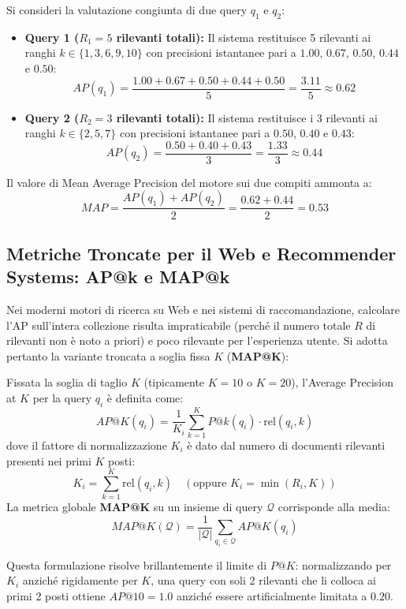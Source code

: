 \begin{example}
Si consideri la valutazione congiunta di due query $q_1$ e $q_2$:
\begin{itemize}
    \item \textbf{Query 1 ($R_1 = 5$ rilevanti totali):} Il sistema restituisce 5 rilevanti ai ranghi $k \in \{1, 3, 6, 9, 10\}$ con precisioni istantanee pari a $1.00$, $0.67$, $0.50$, $0.44$ e $0.50$:
    \[
    AP(q_1) = \frac{1.00 + 0.67 + 0.50 + 0.44 + 0.50}{5} = \frac{3.11}{5} \approx \mathbf{0.62}
    \]
    \item \textbf{Query 2 ($R_2 = 3$ rilevanti totali):} Il sistema restituisce i 3 rilevanti ai ranghi $k \in \{2, 5, 7\}$ con precisioni istantanee pari a $0.50$, $0.40$ e $0.43$:
    \[
    AP(q_2) = \frac{0.50 + 0.40 + 0.43}{3} = \frac{1.33}{3} \approx \mathbf{0.44}
    \]
\end{itemize}
Il valore di Mean Average Precision del motore sui due compiti ammonta a:
\begin{equation}
MAP = \frac{AP(q_1) + AP(q_2)}{2} = \frac{0.62 + 0.44}{2} = \mathbf{0.53}
\end{equation}
\end{example}

\subsection{Metriche Troncate per il Web e Recommender Systems: AP@k e MAP@k}
Nei moderni motori di ricerca su Web e nei sistemi di raccomandazione, calcolare l'AP sull'intera collezione risulta impraticabile (perché il numero totale $R$ di rilevanti non è noto a priori) e poco rilevante per l'esperienza utente.
Si adotta pertanto la variante troncata a soglia fissa $K$ (\textbf{MAP@K}):

\begin{definition}[AP@K e MAP@K]
Fissata la soglia di taglio $K$ (tipicamente $K=10$ o $K=20$), l'Average Precision at $K$ per la query $q_i$ è definita come:
\begin{equation}
AP@K(q_i) = \frac{1}{K_i} \sum_{k=1}^K P@k(q_i) \cdot \mathrm{rel}(q_i, k)
\end{equation}
dove il fattore di normalizzazione $K_i$ è dato dal numero di documenti rilevanti presenti nei primi $K$ posti:
\begin{equation}
K_i = \sum_{k=1}^K \mathrm{rel}(q_i, k) \quad \left(\text{oppure } K_i = \min(R_i, K)\right)
\end{equation}
La metrica globale \textbf{MAP@K} su un insieme di query $\mathcal{Q}$ corrisponde alla media:
\begin{equation}
MAP@K(\mathcal{Q}) = \frac{1}{|\mathcal{Q}|} \sum_{q_i \in \mathcal{Q}} AP@K(q_i)
\end{equation}
\end{definition}
Questa formulazione risolve brillantemente il limite di $P@K$: normalizzando per $K_i$ anziché rigidamente per $K$, una query con soli 2 rilevanti che li colloca ai primi 2 posti ottiene $AP@10 = 1.0$ anziché essere artificialmente limitata a $0.20$.

